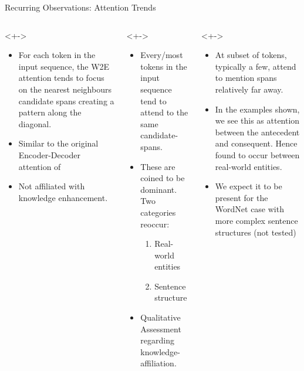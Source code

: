 \begin{frame}{Recurring Observations: Attention Trends}
\footnotesize
\begin{columns}
\begin{column}[T]{0.333\textwidth}<+->
\begin{itemize}
    \item For each token in the input sequence, the W2E attention tends to focus on the nearest neighbours candidate spans creating a pattern along the diagonal.
    \item Similar to the original Encoder-Decoder attention of \cite{Bahdanau2014NeuralTranslate} 
    \item Not affiliated with knowledge enhancement.
\end{itemize}
\end{column}
\begin{column}[T]{0.333\textwidth}<+->
\begin{itemize}
    \item Every/most tokens in the input sequence tend to attend to the same candidate-spans.
    \item These are coined to be dominant. Two categories reoccur:
    \begin{enumerate}
        \item Real-world entities \\
        \item Sentence structure
    \end{enumerate}
    \item Qualitative Assessment regarding knowledge-affiliation.
\end{itemize}
\end{column}
\begin{column}[T]{0.333\textwidth}<+->
\begin{itemize}
    \item At subset of tokens, typically a few, attend to mention spans relatively far away. 
    \item In the examples shown, we see this as attention between the antecedent and consequent. Hence found to occur between real-world entities.
    \item We expect it to be present for the WordNet case with more complex sentence structures (not tested)
\end{itemize}
\end{column}
\end{columns}
\end{frame}

